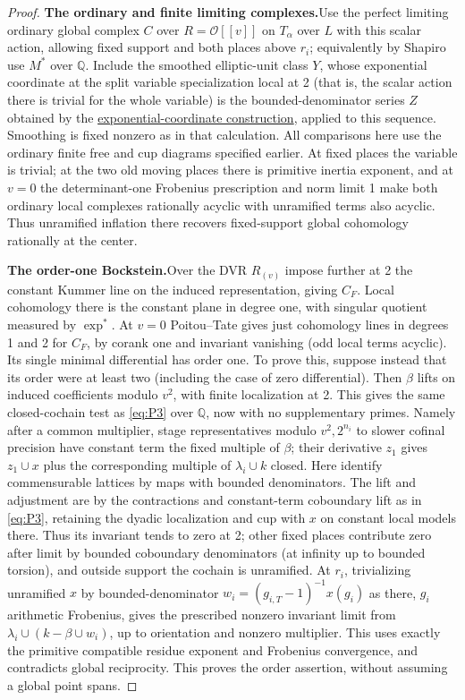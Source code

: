 \begin{proof}
\par\smallskip\noindent\textbf{The ordinary and finite limiting complexes.}\enspace Use the perfect limiting ordinary
global complex \(C\) over \(R=\mathcal O[[v]]\) on \(T_\alpha\) over \(L\) with this scalar
action, allowing fixed support and both places above \(r_i\); equivalently by Shapiro use
\(M^*\) over \(\mathbb Q\). Include the smoothed elliptic-unit class \(Y\), whose exponential
coordinate at the split variable specialization local at 2 (that is, the scalar action there
is trivial for the whole variable) is the bounded-denominator series \(Z\) obtained by the
\hyperref[cm:construction:exponential]{exponential-coordinate construction}, applied to this sequence.
Smoothing is fixed nonzero as in that calculation. All comparisons here use the ordinary
finite free and cup diagrams specified earlier. At fixed places the variable is trivial; at
the two old moving places there is primitive inertia exponent, and at \(v=0\) the
determinant-one Frobenius prescription and norm limit 1 make both ordinary local complexes
rationally acyclic with unramified terms also acyclic. Thus unramified inflation there
recovers fixed-support global cohomology rationally at the center.

\par\smallskip\noindent\textbf{The order-one Bockstein.}\enspace Over the DVR \(R_{(v)}\) impose further at 2 the constant
Kummer line on the induced representation, giving \(C_F\). Local cohomology there is the
constant plane in degree one, with singular quotient measured by \(\exp^*\). At \(v=0\)
Poitou--Tate gives just cohomology lines in degrees 1 and 2 for \(C_F\), by corank one and
invariant vanishing (odd local terms acyclic). Its single minimal differential has order one.
To prove this, suppose instead that its order were at least two
(including the case of zero differential). Then \(\beta\) lifts on induced coefficients modulo
\(v^2\), with finite localization at 2. This gives the same closed-cochain test as
\eqref{eq:P3} over \(\mathbb Q\), now with no supplementary primes. Namely after a common
multiplier, stage representatives modulo \(v^2,2^{n_i}\) to slower cofinal precision have
constant term the fixed multiple of \(\beta\); their derivative \(z_1\) gives \(z_1\cup x\)
plus the corresponding multiple of \(\lambda_i\cup k\) closed. Here identify commensurable
lattices by maps with bounded denominators. The lift and adjustment are by the contractions
and constant-term coboundary lift as in \eqref{eq:P3}, retaining the dyadic localization and
cup with \(x\) on constant local models there. Thus its invariant tends to zero at 2; other
fixed places contribute zero after limit by bounded coboundary denominators (at infinity up to
bounded torsion), and outside support the cochain is unramified. At \(r_i\), trivializing
unramified \(x\) by bounded-denominator \(w_i=(g_{i,T}-1)^{-1}x(g_i)\) as there, \(g_i\)
arithmetic Frobenius, gives the prescribed nonzero invariant limit from
\(\lambda_i\cup(k-\beta\cup w_i)\), up to orientation and nonzero multiplier. This uses
exactly the primitive compatible residue exponent and Frobenius convergence, and contradicts
global reciprocity. This proves the order assertion, without assuming a global point spans.


\end{proof}
